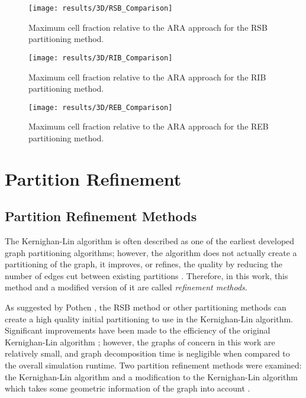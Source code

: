 {{{      \begin{figure}
        \centering
        \texttt{[image: results/3D/RSB\_Comparison]}
        \caption{Maximum cell fraction relative to the \acf{ARA} approach for the \ac{RSB} partitioning method. \label{fig:Spatial Decomposition:RSB 3D Comparison}}
      \end{figure}
      \begin{figure}
        \centering
        \texttt{[image: results/3D/RIB\_Comparison]}
        \caption{Maximum cell fraction relative to the \acf{ARA} approach for the \ac{RIB} partitioning method. \label{fig:Spatial Decomposition:RIB 3D Comparison}}
      \end{figure}
      \begin{figure}
        \centering
        \texttt{[image: results/3D/REB\_Comparison]}
        \caption{Maximum cell fraction relative to the \acf{ARA} approach for the \ac{REB} partitioning method. \label{fig:Spatial Decomposition:REB 3D Comparison}}
      \end{figure}
    }
  }
  \section{Partition Refinement}{\label{sec:Spatial Decomposition:Partition Refinement}
    \subsection{Partition Refinement Methods}{\label{ssec:Spatial Decomposition:Partition Refinement Methods}
      The Kernighan-Lin algorithm \cite{Kernighan1970} is often described as one of the earliest developed graph partitioning algorithms; however, the algorithm does not actually create a partitioning of the graph, it improves, or refines, the quality by reducing the number of edges cut between existing partitions \cite{Elsner1997}.
      Therefore, in this work, this method and a modified version of it are called \emph{refinement methods}.

      As suggested by Pothen \cite{Pothen1989}, the \ac{RSB} method or other partitioning methods can create a high quality initial partitioning to use in the Kernighan-Lin algorithm.
      Significant improvements have been made to the efficiency of the original Kernighan-Lin algorithm \cite{Fiduccia1982}; however, the graphs of concern in this work are relatively small, and graph decomposition time is negligible when compared to the overall simulation runtime.
      Two partition refinement methods were examined: the Kernighan-Lin algorithm \cite{Kernighan1970} and a modification to the Kernighan-Lin algorithm which takes some geometric information of the graph into account \cite{Fitzgerald2017}.

}}}
